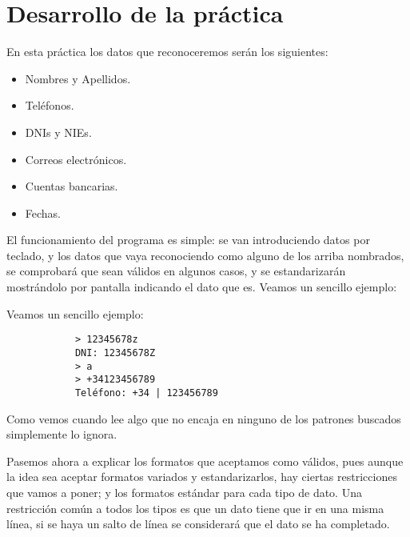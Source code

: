 \documentclass[12pt]{article}
\begin{document}
    \section{Desarrollo de la práctica}
    En esta práctica los datos que reconoceremos serán los siguientes:
    \begin{itemize}
        \item Nombres y Apellidos.
        \item Teléfonos.
        \item DNIs y NIEs.
        \item Correos electrónicos.
        \item Cuentas bancarias.
        \item Fechas.
    \end{itemize}

    El funcionamiento del programa es simple: se van introduciendo datos por teclado, y los datos que vaya reconociendo como alguno de los arriba nombrados, se comprobará que sean válidos en algunos casos, y se estandarizarán mostrándolo por pantalla indicando el dato que es. Veamos un sencillo ejemplo: 
    \begin{ejemplo}
        Veamos un sencillo ejemplo:
        \begin{verbatim}
            > 12345678z
            DNI: 12345678Z
            > a
            > +34123456789
            Teléfono: +34 | 123456789
        \end{verbatim}
        Como vemos cuando lee algo que no encaja en ninguno de los patrones buscados simplemente lo ignora. 
    \end{ejemplo}

    Pasemos ahora a explicar los formatos que aceptamos como válidos, pues aunque la idea sea aceptar formatos variados y estandarizarlos, hay ciertas restricciones que vamos a poner; y los formatos estándar para cada tipo de dato. Una restricción común a todos los tipos es que un dato tiene que ir en una misma línea, si se haya un salto de línea se considerará que el dato se ha completado. 
\end{document}
